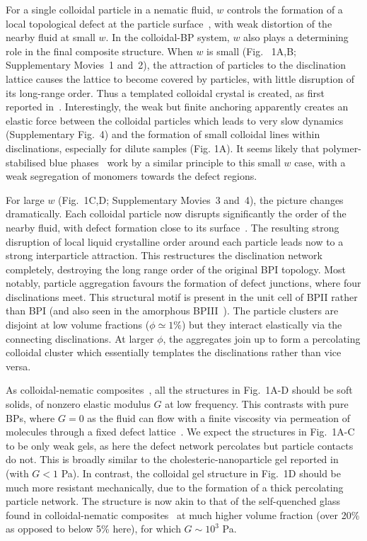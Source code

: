 \documentclass[12pt]{article}
\begin{document}
For a single colloidal particle in a nematic fluid, $w$ controls the formation of a local topological defect at the particle surface~\cite{stark}, with weak distortion of the nearby fluid at small $w$. In the colloidal-BP system, $w$ also plays a determining role in the final composite structure. When $w$ is small (Fig.~ 1A,B; Supplementary Movies~1 and~2), the attraction of particles to the disclination lattice causes
 the lattice to become covered by particles, with little disruption of its
 long-range order. Thus a templated colloidal crystal is created, as first reported in~\cite{miha}. Interestingly, the weak but finite anchoring apparently creates an elastic force between the colloidal particles which leads to very slow dynamics
(Supplementary Fig.~4) and the formation of small colloidal lines within disclinations, especially for dilute samples (Fig. 1A). It seems likely that polymer-stabilised  blue phases~\cite{kikuchi} work by a similar principle to this small $w$ case, with a weak segregation of monomers towards the defect regions.

For large $w$ (Fig.~1C,D; Supplementary Movies~3 and~4), the picture changes
dramatically.
Each colloidal particle now disrupts significantly the order of the nearby fluid, with defect formation close to its surface~\cite{stark}. The resulting strong disruption of local liquid crystalline order around each particle leads now to 
a strong interparticle attraction. This restructures the disclination
network completely, destroying the long range order of
the original BPI topology. Most notably, particle aggregation favours
the formation of defect junctions, where four disclinations meet. This structural motif is present in the unit cell of BPII rather than BPI (and also seen in the amorphous BPIII~\cite{bp3}). The particle clusters are disjoint at low volume fractions ($\phi\simeq 1\%$) but they interact elastically via the connecting disclinations. At larger $\phi$, the aggregates join up to form a percolating colloidal cluster which essentially templates the disclinations rather than vice versa. 

As colloidal-nematic composites~\cite{tiffany}, all the structures in
Fig.~1A-D 
should be soft solids, of nonzero elastic 
modulus $G$ at low frequency. This contrasts with pure BPs, where
$G=0$ as the fluid can flow with a finite
viscosity via permeation of molecules through a fixed defect lattice~\cite{permeation1,permeation2}. We expect the
structures in Fig.~1A-C to be only weak gels, as here the 
defect network percolates but particle contacts do not. This is broadly similar to the cholesteric-nanoparticle gel reported
in~\cite{lubensky} (with $G<1$ Pa). In contrast, the colloidal gel
structure in Fig.~1D should be much more resistant mechanically, 
due to the formation of a thick percolating particle network. The 
structure is now akin to that of the self-quenched glass found in 
colloidal-nematic composites~\cite{tiffany} at much higher volume 
fraction (over 20\% as opposed to below 5\% here), for which $G\sim 10^3$ Pa.
\end{document}
